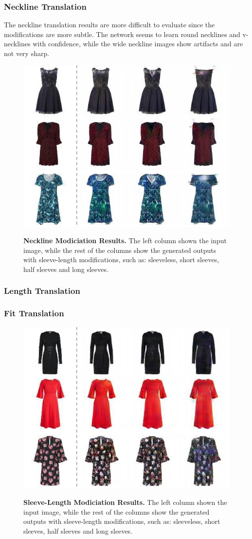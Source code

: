 \documentclass[12pt]{report}
\begin{document}
\subsubsection{Neckline Translation}
The neckline translation results are more difficult to evaluate since the modifications are more subtle. The network seems to learn round necklines and v-necklines with confidence, while the wide neckline images show artifacts and are not very sharp.

\begin{figure}[h]
\centering
{\includegraphics[width=.7\linewidth]{04_experiments/stargan/neckline_results}}
\caption{\label{fig:neckline_results} \textbf{Neckline Modiciation Results.} The left column shown the input image, while the rest of the columns show the generated outputs with sleeve-length modifications, such as: sleeveless, short sleeves, half sleeves and long sleeves.}
\end{figure}

\subsubsection{Length Translation}


\subsubsection{Fit Translation}

\begin{figure}[h]
\centering
{\includegraphics[width=.7\linewidth]{04_experiments/stargan/fit_results}}
\caption{\label{fig:fit_results} \textbf{Sleeve-Length Modiciation Results.} The left column shown the input image, while the rest of the columns show the generated outputs with sleeve-length modifications, such as: sleeveless, short sleeves, half sleeves and long sleeves.}
\end{figure}
\end{document}
